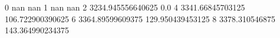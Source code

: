 0 nan nan
1 nan nan
2 3234.945556640625 0.0
4 3341.66845703125 106.722900390625
6 3364.89599609375 129.950439453125
8 3378.310546875 143.364990234375

